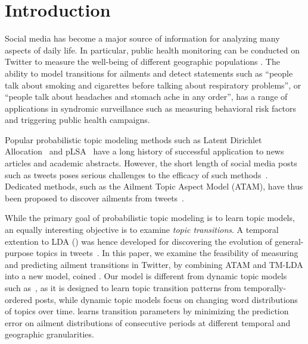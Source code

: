 \section{Introduction}
Social media has become a major source of information for analyzing
many aspects of daily life. In particular, public health monitoring can
be conducted on Twitter to measure the well-being of different geographic
populations \cite{atam2}. The ability to model
transitions for ailments and detect statements such as ``people talk
about smoking and cigarettes before talking about respiratory
problems'', or ``people talk about headaches and stomach ache in any
order'', has a range of applications in syndromic surveillance such as
measuring behavioral risk factors and triggering public health
campaigns. 

Popular probabilistic topic modeling methods such as Latent Dirichlet Allocation~\cite{lda} and
pLSA~\cite{plsi} have a long history of successful application to news articles and academic abstracts.
However, the short length of social media posts such as tweets  poses serious
challenges to the efficacy of such methods~\cite{DBLP:conf/ecir/ZhaoJWHLYL11}.
Dedicated methods, such as the Ailment Topic Aspect Model (ATAM), have thus 
been proposed to discover ailments from tweets~\cite{atam2}.

While the primary goal of probabilistic topic modeling is to learn topic models, an equally interesting objective is to examine \emph{topic transitions}.
A temporal extention to LDA (\tmlda) was hence developed for discovering 
the evolution of general-purpose topics in tweets~\cite{DBLP:conf/kdd/WangAB12}. 
In this paper, we examine the feasibility of measuring and predicting ailment
transitions in Twitter, by combining ATAM and TM-LDA into a new model,
coined \tmatam. Our model is different from dynamic
topic models such as~\cite{DBLP:conf/icml/BleiL06, DBLP:conf/kdd/WangM06}, as it is designed to learn topic
transition patterns from temporally-ordered posts, while dynamic topic
models focus on changing word distributions of topics over
time. \tmatam learns transition parameters by minimizing the prediction error on ailment 
distributions of consecutive periods at different temporal and geographic 
granularities.

